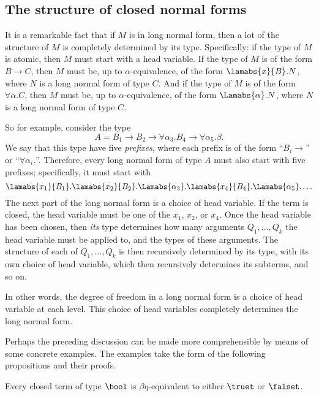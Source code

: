 \documentclass[12pt]{article}
\begin{document}
\subsection{The structure of closed normal forms}

It is a remarkable fact that if $M$ is in long normal form, then a lot
of the structure of $M$ is completely determined by its type.
Specifically: if the type of $M$ is atomic, then $M$ must start with a
head variable. If the type of $M$ is of the form $B\to C$, then $M$
must be, up to $\alpha$-equivalence, of the form $\lamabs{x}{B}.N$,
where $N$ is a long normal form of type $C$. And if the type of $M$ is
of the form $\forall\alpha.C$, then $M$ must be, up to
$\alpha$-equivalence, of the form $\Lamabs{\alpha}.N$, where $N$ is a
long normal form of type $C$. 

So for example, consider the type 
\[ A=B_1\to B_2\to\forall \alpha_3. B_4\to\forall\alpha_5.\beta.
\]
We say that this type have five {\em prefixes}, where each prefix is
of the form ``$B_i\to$'' or ``$\forall\alpha_i.$''. Therefore, every
long normal form of type $A$ must also start with five prefixes;
specifically, it must start with 
\[ \lamabs{x_1}{B_1}.\lamabs{x_2}{B_2}.\Lamabs{\alpha_3}.\lamabs{x_4}{B_4}.\Lamabs{\alpha_5}.\ldots
\]
The next part of the long normal form is a choice of head variable. If
the term is closed, the head variable must be one of the $x_1$, $x_2$,
or $x_4$. Once the head variable has been chosen, then {\em its} type
determines how many arguments $Q_1,\ldots,Q_k$ the head variable must
be applied to, and the types of these arguments. The structure of each
of $Q_1,\ldots,Q_k$ is then recursively determined by its type, with
its own choice of head variable, which then recursively determines its
subterms, and so on. 

In other words, the degree of freedom in a long normal form is a
choice of head variable at each level. This choice of head variables
completely determines the long normal form.

Perhaps the preceding discussion can be made more comprehensible by
means of some concrete examples. The examples take the form of the
following propositions and their proofs.

\begin{proposition}\label{prop-unique-bool}
  Every closed term of type $\bool$ is $\beta\eta$-equivalent to
  either $\truet$ or $\falset$.
\end{proposition}
\end{document}
